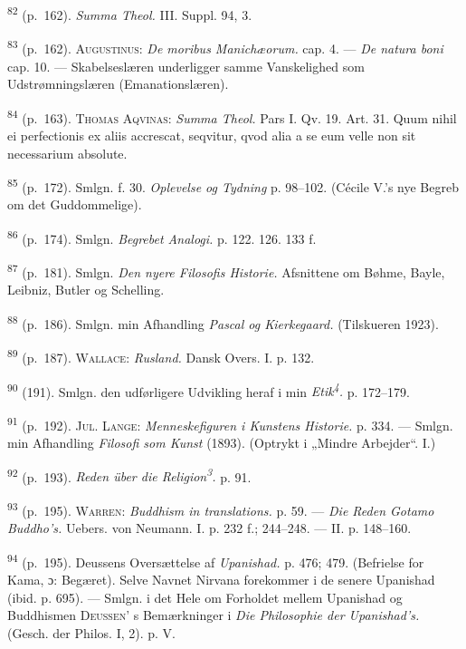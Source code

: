 \documentclass[12pt,a4paper,openany]{book}
\newcommand{\opage}[1]{\marginnote{\footnotesize\textit{[#1]}}}
\begin{document}
\begin{small}
\textsuperscript{82} (p.~162). \textit{Summa Theol.} III. Suppl. 94, 3.

\textsuperscript{83} (p.~162). \textsc{Augustinus}: \textit{De moribus
Manichæorum.} cap. 4. ---
\textit{De natura boni} cap. 10. --- Skabelseslæren underligger samme
Vanskelighed som Udstrømningslæren (Emanationslæren).

\opage{254}\textsuperscript{84} (p.~163). \textsc{Thomas Aqvinas}:
\textit{Summa Theol.} Pars I. Qv. 19. Art. 31.
Quum nihil ei perfectionis ex aliis accrescat, seqvitur, qvod alia a se
eum velle non sit necessarium absolute.

\textsuperscript{85} (p.~172). Smlgn. f. 30. \textit{Oplevelse og
Tydning} p. 98--102. (Cécile V.’s nye
Begreb om det Guddommelige).

\textsuperscript{86} (p.~174). Smlgn. \textit{Begrebet Analogi.} p. 122.
126. 133 f.

\textsuperscript{87} (p.~181). Smlgn. \textit{Den nyere Filosofis
Historie.} Afsnittene om Bøhme,
Bayle, Leibniz, Butler og Schelling.

\textsuperscript{88} (p.~186). Smlgn. min Afhandling \textit{Pascal og
Kierkegaard.} (Tilskueren 1923).

\textsuperscript{89} (p.~187). \textsc{Wallace}: \textit{Rusland.} Dansk
Overs. I. p. 132.

\textsuperscript{90} (191). Smlgn. den udførligere Udvikling heraf i min
\textit{Etik\textsuperscript{4}.} p. 172--179.

\textsuperscript{91} (p.~192). \textsc{Jul. Lange}:
\textit{Menneskefiguren i Kunstens Historie.} p.
334. --- Smlgn. min Afhandling \textit{Filosofi som Kunst} (1893).
(Optrykt i „Mindre Arbejder“. I.)

\textsuperscript{92} (p.~193). \textit{Reden über die
Religion\textsuperscript{3}.} p. 91.

\textsuperscript{93} (p.~195). \textsc{Warren:} \textit{Buddhism in
translations.} p. 59. ---
\textit{Die Reden Gotamo Buddho’s.} Uebers. von Neumann. I. p. 232 f.;
244--248. --- II. p. 148--160.

\textsuperscript{94} (p.~195). Deussens Oversættelse af
\textit{Upanishad.} p. 476; 479. (Befrielse for
Kama, ɔ: Begæret). Selve Navnet Nirvana forekommer i de senere Upanishad
(ibid. p. 695). --- Smlgn. i det Hele om Forholdet mellem Upanishad og
Buddhismen \textsc{Deussen’} s Bemærkninger i \textit{Die Philosophie
der Upanishad’s.} (Gesch. der Philos. I, 2). p. V.


\end{small}
\end{document}
